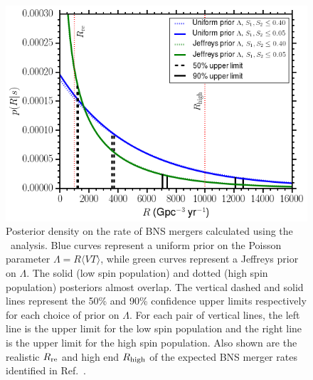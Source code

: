\begin{figure}[t]
   \centering
   \includegraphics[width=\columnwidth]{figs/chapter3/figure3.png} 
   \caption{Posterior density on the rate of \ac{BNS} mergers calculated using the \pycbc\ analysis.
   Blue curves represent
   a uniform prior on the Poisson parameter $\Lambda = R \langle VT \rangle$, while
   green curves represent a Jeffreys prior on $\Lambda$. The solid (low spin population)
   and dotted (high spin population) posteriors almost overlap. The vertical dashed and
   solid lines represent the 50\% and 90\% confidence upper limits respectively for each
   choice of prior on $\Lambda$. For each pair of vertical lines, the left line is the 
   upper limit for the low spin population and the right line is the upper limit for the high
   spin population. Also shown are the realistic $R_{\rm re}$ and high end
   $R_{\rm high}$ of the expected \ac{BNS} merger rates identified in Ref.~\citep{Abadie:2010cf}.}
   \label{fig:bnspdf}
\end{figure}

